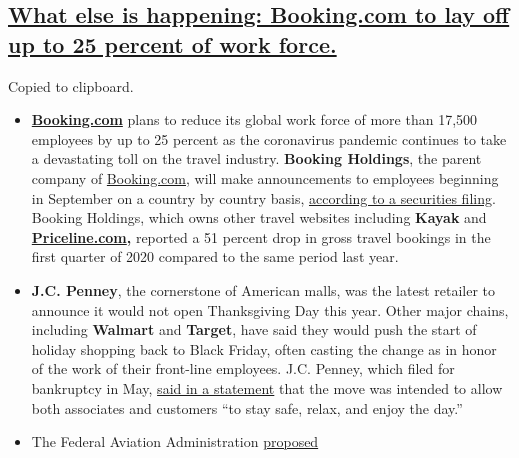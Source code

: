 \hypertarget{what-else-is-happening-bookingcom-to-lay-off-up-to-25-percent-of-work-force}{%
\subsection{\texorpdfstring{\protect\hyperlink{what-else-is-happening-bookingcom-to-lay-off-up-to-25-percent-of-work-force}{What
else is happening: Booking.com to lay off up to 25 percent of work
force.}}{What else is happening: Booking.com to lay off up to 25 percent of work force.}}\label{what-else-is-happening-bookingcom-to-lay-off-up-to-25-percent-of-work-force}}

Copied to clipboard.

\begin{itemize}
\item
  \textbf{\href{http://booking.com/}{Booking.com}} plans to reduce its
  global work force of more than 17,500 employees by up to 25 percent as
  the coronavirus pandemic continues to take a devastating toll on the
  travel industry. \textbf{Booking Holdings}, the parent company of
  \href{http://booking.com/}{Booking.com}, will make announcements to
  employees beginning in September on a country by country basis,
  \href{https://www.sec.gov/ix?doc=/Archives/edgar/data/1075531/000107553120000042/bkng-20200804.htm}{according
  to a securities filing}. Booking Holdings, which owns other travel
  websites including \textbf{Kayak} and
  \textbf{\href{http://priceline.com/}{Priceline.com},} reported a 51
  percent drop in gross travel bookings in the first quarter of 2020
  compared to the same period last year.
\item
  \textbf{J.C. Penney}, the cornerstone of American malls, was the
  latest retailer to announce it would not open Thanksgiving Day this
  year. Other major chains, including \textbf{Walmart} and
  \textbf{Target}, have said they would push the start of holiday
  shopping back to Black Friday, often casting the change as in honor of
  the work of their front-line employees. J.C. Penney, which filed for
  bankruptcy in May,
  \href{https://companyblog.jcpnewsroom.com/2020/08/03/jcpenney-to-close-stores-on-thanksgiving-day-2020/}{said
  in a statement} that the move was intended to allow both associates
  and customers ``to stay safe, relax, and enjoy the day.''
\item
  The Federal Aviation Administration
  \href{https://www.nytimes3xbfgragh.onion/live/2020/08/03/business/stock-market-today-coronavirus/faa-says-boeing-has-effectively-mitigated-defects-in-the-737-max}{proposed
}
\end{itemize}
